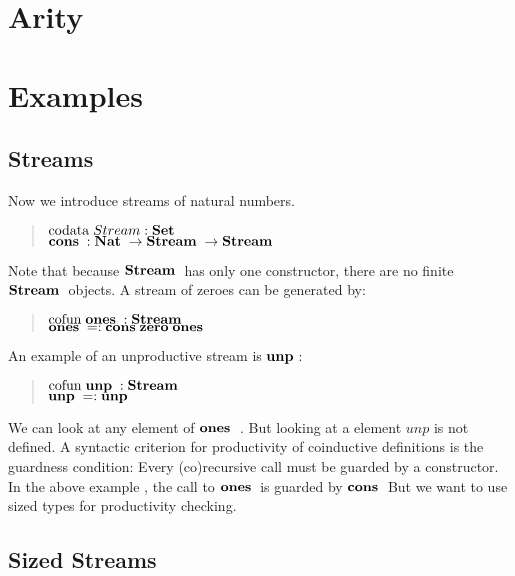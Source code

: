 \section{Arity}

\section{Examples}

\subsection{Streams}
Now we introduce streams of natural numbers.
\begin{quote}
$\mathrm{codata}\; Stream : \mathbf{Set} $ 
\\
$\mathbf{cons}\; : \mathbf{Nat}\; \rightarrow \mathbf{Stream}\; \rightarrow \mathbf{Stream}\; $
\end{quote}
Note that because $\mathbf{Stream}\;$ has only one constructor, there are no finite $\mathbf{Stream}\;$ objects.
A stream of zeroes can be generated by:
\begin{quote}
$\mathrm{cofun}\; \mathbf{ones}\;: \mathbf{Stream}\; $ 
\\
$\mathbf{ones}\; = : \mathbf{cons}\; \mathbf{zero}\; \mathbf{ones}\;$
\end{quote}

An example of an unproductive stream is $\mathbf{unp}\;$:
\begin{quote}
$\mathrm{cofun}\; \mathbf{unp}\; : \mathbf{Stream}\; $ 
\\
$\mathbf{unp}\; = : \mathbf{unp}\;$
\end{quote}
We can look at any element of $\mathbf{ones}\;$ .
But looking at a element $ unp $ is not defined. 
A syntactic criterion for productivity of coinductive definitions is the guardness condition:
Every (co)recursive call must be guarded by a constructor.
In the above example , the call to $\mathbf{ones}\;$ is guarded by $\mathbf{cons}\;$
But we want to use sized types for productivity checking.
\subsection{Sized Streams}

